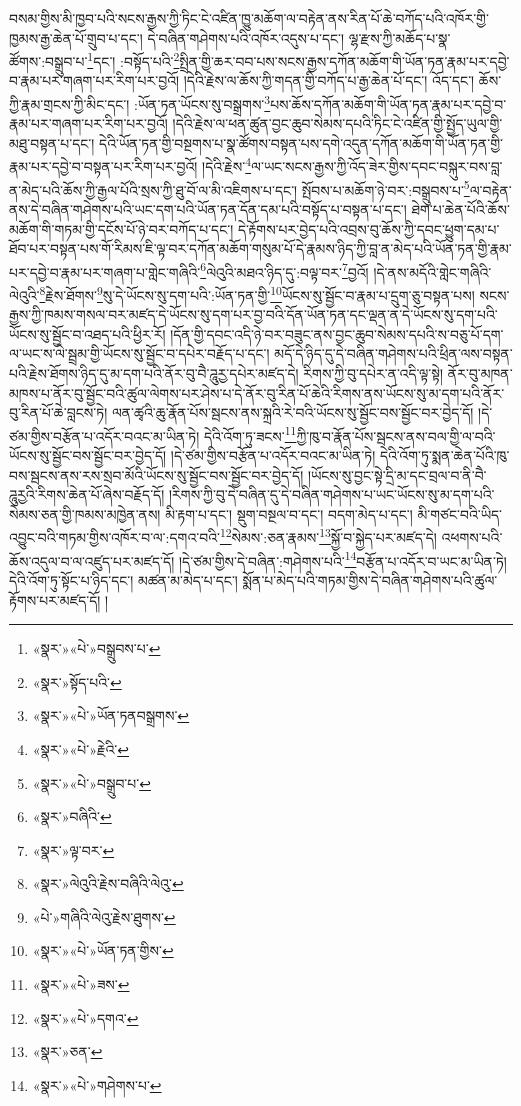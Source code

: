 བསམ་གྱིས་མི་ཁྱབ་པའི་སངས་རྒྱས་ཀྱི་ཏིང་ངེ་འཛིན་ཁྱུ་མཆོག་ལ་བརྟེན་ནས་རིན་པོ་ཆེ་བཀོད་པའི་འཁོར་གྱི་ཁྱམས་རྒྱ་ཆེན་པོ་གྲུབ་པ་དང་། དེ་བཞིན་གཤེགས་པའི་འཁོར་འདུས་པ་དང་། ལྷ་རྫས་ཀྱི་མཆོད་པ་སྣ་ཚོགས་:བསྒྲུབ་པ་\footnote{«སྣར་»«པེ་»བསྒྲུབས་པ་}དང་། :བསྟོད་པའི་\footnote{«སྣར་»སྟོད་པའི་}སྤྲིན་གྱི་ཆར་བབ་པས་སངས་རྒྱས་དཀོན་མཆོག་གི་ཡོན་ཏན་རྣམ་པར་དབྱེ་བ་རྣམ་པར་གཞག་པར་རིག་པར་བྱའོ། །དེའི་རྗེས་ལ་ཆོས་ཀྱི་གདན་གྱི་བཀོད་པ་རྒྱ་ཆེན་པོ་དང་། འོད་དང་། ཆོས་ཀྱི་རྣམ་གྲངས་ཀྱི་མིང་དང་། :ཡོན་ཏན་ཡོངས་སུ་བསྒྲགས་\footnote{«སྣར་»«པེ་»ཡོན་ཏནབསྒྲགས་}པས་ཆོས་དཀོན་མཆོག་གི་ཡོན་ཏན་རྣམ་པར་དབྱེ་བ་རྣམ་པར་གཞག་པར་རིག་པར་བྱའོ། །དེའི་རྗེས་ལ་ཕན་ཚུན་བྱང་ཆུབ་སེམས་དཔའི་ཏིང་ངེ་འཛིན་གྱི་སྤྱོད་ཡུལ་གྱི་མཐུ་བསྟན་པ་དང་། དེའི་ཡོན་ཏན་གྱི་བསྔགས་པ་སྣ་ཚོགས་བསྟན་པས་དགེ་འདུན་དཀོན་མཆོག་གི་ཡོན་ཏན་གྱི་རྣམ་པར་དབྱེ་བ་བསྟན་པར་རིག་པར་བྱའོ། །དེའི་རྗེས་\footnote{«སྣར་»«པེ་»རྗེའི་}ལ་ཡང་སངས་རྒྱས་ཀྱི་འོད་ཟེར་གྱིས་དབང་བསྐུར་བས་བླ་ན་མེད་པའི་ཆོས་ཀྱི་རྒྱལ་པོའི་སྲས་ཀྱི་ཐུ་བོ་ལ་མི་འཇིགས་པ་དང་། སྤོབས་པ་མཆོག་ཉེ་བར་:བསྒྲུབས་པ་\footnote{«སྣར་»«པེ་»བསྒྲུབ་པ་}ལ་བརྟེན་ནས་དེ་བཞིན་གཤེགས་པའི་ཡང་དག་པའི་ཡོན་ཏན་དོན་དམ་པའི་བསྟོད་པ་བསྟན་པ་དང་། ཐེག་པ་ཆེན་པོའི་ཆོས་མཆོག་གི་གཏམ་གྱི་དངོས་པོ་ཉེ་བར་བཀོད་པ་དང་། དེ་རྟོགས་པར་བྱེད་པའི་འབྲས་བུ་ཆོས་ཀྱི་དབང་ཕྱུག་དམ་པ་ཐོབ་པར་བསྟན་པས་གོ་རིམས་ཇི་ལྟ་བར་དཀོན་མཆོག་གསུམ་པོ་དེ་རྣམས་ཉིད་ཀྱི་བླ་ན་མེད་པའི་ཡོན་ཏན་གྱི་རྣམ་པར་དབྱེ་བ་རྣམ་པར་གཞག་པ་གླེང་གཞིའི་\footnote{«སྣར་»བཞིའི་}ལེའུའི་མཐའ་ཉིད་དུ་:བལྟ་བར་\footnote{«སྣར་»ལྟ་བར་}བྱའོ། །དེ་ནས་མདོའི་གླེང་གཞིའི་ལེའུའི་\footnote{«སྣར་»ལེའུའི་རྗེས་བཞིའི་ལེའུ་}རྗེས་ཐོགས་\footnote{«པེ་»གཞིའི་ལེའུ་རྗེས་ཐུགས་}སུ་དེ་ཡོངས་སུ་དག་པའི་:ཡོན་ཏན་གྱི་\footnote{«སྣར་»«པེ་»ཡོན་ཏན་གྱིས་}ཡོངས་སུ་སྦྱོང་བ་རྣམ་པ་དྲུག་ཅུ་བསྟན་པས། སངས་རྒྱས་ཀྱི་ཁམས་གསལ་བར་མཛད་དེ་ཡོངས་སུ་དག་པར་བྱ་བའི་དོན་ཡོན་ཏན་དང་ལྡན་ན་དེ་ཡོངས་སུ་དག་པའི་ཡོངས་སུ་སྦྱོང་བ་འཐད་པའི་ཕྱིར་རོ། །དོན་གྱི་དབང་འདི་ཉེ་བར་བཟུང་ནས་བྱང་ཆུབ་སེམས་དཔའི་ས་བཅུ་པོ་དག་ལ་ཡང་ས་ལེ་སྦྲམ་གྱི་ཡོངས་སུ་སྦྱོང་བ་དཔེར་བརྗོད་པ་དང་། མདོ་དེ་ཉིད་དུ་དེ་བཞིན་གཤེགས་པའི་ཕྲིན་ལས་བསྟན་པའི་རྗེས་ཐོགས་ཉིད་དུ་མ་དག་པའི་ནོར་བུ་བཻ་ཌཱུརྱ་དཔེར་མཛད་དེ། རིགས་ཀྱི་བུ་དཔེར་ན་འདི་ལྟ་སྟེ། ནོར་བུ་མཁན་མཁས་པ་ནོར་བུ་སྦྱོང་བའི་ཚུལ་ལེགས་པར་ཤེས་པ་དེ་ནོར་བུ་རིན་པོ་ཆེའི་རིགས་ནས་ཡོངས་སུ་མ་དག་པའི་ནོར་བུ་རིན་པོ་ཆེ་བླངས་ཏེ། ལན་ཚྭའི་ཆུ་རྣོན་པོས་སྦངས་ནས་སྐྲའི་རེ་བའི་ཡོངས་སུ་སྦྱོང་བས་སྦྱོང་བར་བྱེད་དོ། །དེ་ཙམ་གྱིས་བརྩོན་པ་འདོར་བའང་མ་ཡིན་ཏེ། དེའི་འོག་ཏུ་ཟངས་\footnote{«སྣར་»«པེ་»ཟས་}ཀྱི་ཁུ་བ་རྣོན་པོས་སྦངས་ནས་བལ་གྱི་ལ་བའི་ཡོངས་སུ་སྦྱོང་བས་སྦྱོང་བར་བྱེད་དོ། །དེ་ཙམ་གྱིས་བརྩོན་པ་འདོར་བའང་མ་ཡིན་ཏེ། དེའི་འོག་ཏུ་སྨན་ཆེན་པོའི་ཁུ་བས་སྦངས་ནས་རས་སྲབ་མོའི་ཡོངས་སུ་སྦྱོང་བས་སྦྱོང་བར་བྱེད་དོ། །ཡོངས་སུ་བྱང་སྟེ་དྲི་མ་དང་བྲལ་བ་ནི་བཻ་ཌཱུརྱའི་རིགས་ཆེན་པོ་ཞེས་བརྗོད་དོ། །རིགས་ཀྱི་བུ་དེ་བཞིན་དུ་དེ་བཞིན་གཤེགས་པ་ཡང་ཡོངས་སུ་མ་དག་པའི་སེམས་ཅན་གྱི་ཁམས་མཁྱེན་ནས། མི་རྟག་པ་དང་། སྡུག་བསྔལ་བ་དང་། བདག་མེད་པ་དང་། མི་གཙང་བའི་ཡིད་འབྱུང་བའི་གཏམ་གྱིས་འཁོར་བ་ལ་:དགའ་བའི་\footnote{«སྣར་»«པེ་»དགའ་}སེམས་:ཅན་རྣམས་\footnote{«སྣར་»ཅན་}སྐྱོ་བ་སྐྱེད་པར་མཛད་དེ། འཕགས་པའི་ཆོས་འདུལ་བ་ལ་འཛུད་པར་མཛད་དོ། །དེ་ཙམ་གྱིས་དེ་བཞིན་:གཤེགས་པའི་\footnote{«སྣར་»«པེ་»གཤེགས་པ་}བརྩོན་པ་འདོར་བ་ཡང་མ་ཡིན་ཏེ། དེའི་འོག་ཏུ་སྟོང་པ་ཉིད་དང་། མཚན་མ་མེད་པ་དང་། སྨོན་པ་མེད་པའི་གཏམ་གྱིས་དེ་བཞིན་གཤེགས་པའི་ཚུལ་རྟོགས་པར་མཛད་དོ། །

